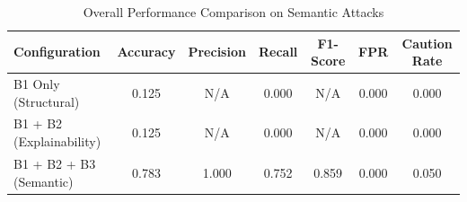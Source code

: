 \begin{table}[h]
\centering
\caption{Overall Performance Comparison on Semantic Attacks}
\label{tab:semantic_results}
\begin{tabular}{lcccccc}
\hline
\textbf{Configuration} & \textbf{Accuracy} & \textbf{Precision} & \textbf{Recall} & \textbf{F1-Score} & \textbf{FPR} & \textbf{Caution Rate} \\ \hline
B1 Only (Structural) & 0.125 & N/A & 0.000 & N/A & 0.000 & 0.000 \\
B1 + B2 (Explainability) & 0.125 & N/A & 0.000 & N/A & 0.000 & 0.000 \\
B1 + B2 + B3 (Semantic) & 0.783 & 1.000 & 0.752 & 0.859 & 0.000 & 0.050 \\
\hline
\end{tabular}
\end{table}
